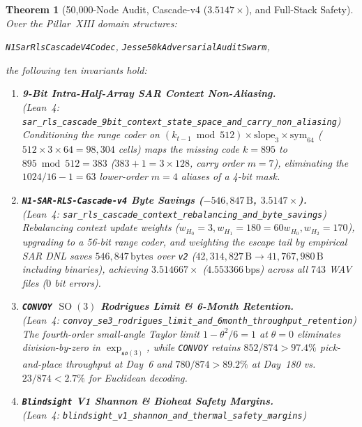 \documentclass[11pt,letterpaper]{article}
\newcommand{\lean}[1]{\nolinkurl{#1}}
\newtheorem{theorem}{Theorem}[section]
\theoremstyle{definition}
\begin{document}
\begin{theorem}[50,000-Node Audit, Cascade-v4 ($3.5147\times$), and Full-Stack Safety]\label{thm:pillar13}
Over the Pillar~XIII domain structures:
\begin{center}
\footnotesize
\lean{N1SarRlsCascadeV4Codec}, \quad \lean{Jesse50kAdversarialAuditSwarm},
\end{center}
the following ten invariants hold:
\begin{enumerate}
  \item \textbf{9-Bit Intra-Half-Array SAR Context Non-Aliasing.}\\
  (\emph{Lean~4:} \lean{sar_rls_cascade_9bit_context_state_space_and_carry_non_aliasing})\\
  Conditioning the range coder on $(k_{t-1} \bmod 512) \times \mathrm{slope}_3 \times \mathrm{sym}_{64}$ ($512 \times 3 \times 64 = 98{,}304$ cells) maps the missing code $k = 895$ to $895 \bmod 512 = 383$ ($383 + 1 = 3 \times 128$, carry order $m = 7$), eliminating the $1024/16 - 1 = 63$ lower-order $m = 4$ aliases of a 4-bit mask.
  \item \textbf{\nolinkurl{N1-SAR-RLS-Cascade-v4} Byte Savings ($-546{,}847\,\text{B}$, $3.5147\times$).}\\
  (\emph{Lean~4:} \lean{sar_rls_cascade_context_rebalancing_and_byte_savings})\\
  Rebalancing context update weights ($w_{H_0} = 3, w_{H_1} = 180 = 60 w_{H_0}, w_{H_2} = 170$), upgrading to a 56-bit range coder, and weighting the escape tail by empirical SAR DNL saves $546{,}847\,\text{bytes}$ over \texttt{v2} ($42{,}314{,}827\,\text{B} \to 41{,}767{,}980\,\text{B}$ including binaries), achieving \textbf{$3.514667\times$} ($4.553366\,\text{bps}$) across all $743$ WAV files ($0$ bit errors).
  \item \textbf{\texttt{CONVOY} $\operatorname{SO}(3)$ Rodrigues Limit \& 6-Month Retention.}\\
  (\emph{Lean~4:} \lean{convoy_se3_rodrigues_limit_and_6month_throughput_retention})\\
  The fourth-order small-angle Taylor limit $1 - \theta^2/6 = 1$ at $\theta = 0$ eliminates division-by-zero in $\exp_{\mathfrak{so}(3)}$, while \texttt{CONVOY} retains $852/874 > 97.4\%$ pick-and-place throughput at Day~6 and $780/874 > 89.2\%$ at Day~180 vs.\ $23/874 < 2.7\%$ for Euclidean decoding.
  \item \textbf{\texttt{Blindsight} V1 Shannon \& Bioheat Safety Margins.}\\
  (\emph{Lean~4:} \lean{blindsight_v1_shannon_and_thermal_safety_margins})\\

\end{enumerate}
\end{theorem}
\end{document}
